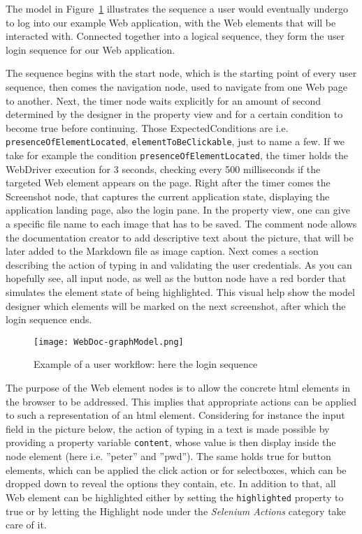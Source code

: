 The model in Figure~\ref{fig:loginSeq} illustrates the sequence a user would eventually undergo to log into our example Web application, with the Web elements that will be interacted with. Connected together into a logical sequence, they form the user login sequence for our Web application. 

The sequence begins with the start node, which is the starting point of every user sequence, then comes the navigation node, used to navigate from one Web page to another. Next, the timer node waits explicitly for an amount of second  determined by the designer in the property view and for a certain condition to become true before continuing. Those ExpectedConditions are i.e. \lstinline{presenceOfElementLocated}, \lstinline{elementToBeClickable}, just to name a few. If we take for example the condition \lstinline{presenceOfElementLocated}, the timer holds the WebDriver execution for 3 seconds, checking every 500 milliseconds if the targeted Web element appears on the page. Right after the timer comes the Screenshot node, that captures the current application state, displaying the application landing page, also the login pane. In the property view, one can give a specific file name to each image that has to be saved. The comment node allows the documentation creator to add descriptive text about the picture, that will be later added to the Markdown file as image caption. Next comes a section describing the action of typing in and validating the user credentials. As you can hopefully see, all input node, as well as the button node have a red border that simulates the element state of being highlighted. This visual help show the model designer which elements will be marked on the next screenshot, after which the login sequence ends.
\begin{figure}[h]
    \centering
    \texttt{[image: WebDoc-graphModel.png]}
    \caption{Example of a user workflow: here the login sequence}
    \label{fig:loginSeq}
\end{figure}

The purpose of the Web element nodes is to allow the concrete \gls*{html} elements in the browser to be addressed. This implies that appropriate actions can be applied to such a representation of an \gls*{html} element. Considering for instance the input field in the picture below, the action of typing in a text is made possible by providing a property variable \lstinline{content}, whose value is then display inside the node element (here i.e. ''peter'' and ''pwd''). The same holds true for button elements, which can be applied the click action or for selectboxes, which can be dropped down to reveal the options they contain, etc. In addition to that, all Web element can be highlighted either by setting the \lstinline{highlighted} property to true or by letting the Highlight node under the \textit{Selenium Actions} category take care of it. 

